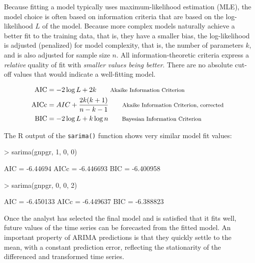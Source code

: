 Because fitting a model typically uses maximum-likelihood estimation (MLE), the model choice is often based on information criteria that are based on the log-likelihood $L$ of the model. Because more complex models naturally achieve a better fit to the training data, that is, they have a smaller bias, the log-likelihood is adjusted (penalized) for model complexity, that is, the number of parameters $k$, and is also adjusted for sample size $n$. All information-theoretic criteria express a \emph{relative} quality of fit with \emph{smaller values being better}. There are no absolute cut-off values that would indicate a well-fitting model.

\begin{align*}
\operatorname{AIC} &= -2 \log L + 2k  \qquad \text{\footnotesize Akaike Information Criterion}\index{Akaike information criterion}\index{AIC|see{Akaike information criterion}}\\
\operatorname{AICc} &= AIC + \frac{2k(k+1)}{n-k-1} \qquad \text{\footnotesize Akaike Information Criterion, corrected}\\
\operatorname{BIC} &= -2 \log L + k \log n \qquad \text{\footnotesize Bayesian Information Criterion}\index{Bayesian information criterion}\index{BIC|see{Bayesian information criterion}}
\end{align*}

\noindent The R output of the \texttt{sarima()} function shows very similar model fit values:

\begin{samepage}
\begin{textcode}
> sarima(gnpgr, 1, 0, 0)

AIC = -6.44694  AICc = -6.446693  BIC = -6.400958 
\end{textcode}
\end{samepage}

\begin{samepage}
\begin{textcode}
> sarima(gnpgr, 0, 0, 2)

AIC = -6.450133  AICc = -6.449637  BIC = -6.388823 
\end{textcode}
\end{samepage}

Once the analyst has selected the final model and is satisfied that it fits well, future values of the time series can be forecasted from the fitted model. An important property of ARIMA predictions is that they quickly settle to the mean, with a constant prediction error, reflecting the stationarity of the differenced and transformed time series.


